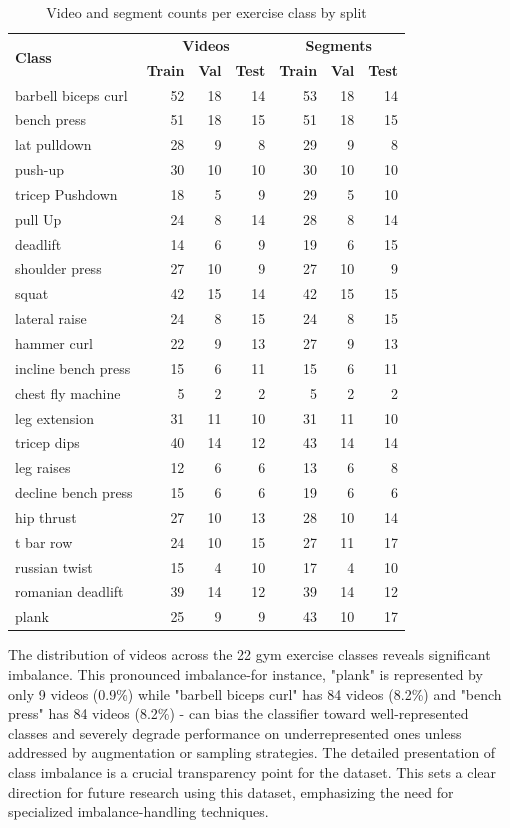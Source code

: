 \documentclass[journal,onecolumn, 11pt]{IEEEtran}
\begin{document}
\begin{table}[H]
\centering
\caption{Video and segment counts per exercise class by split}
\label{tab:counts-per-class}
\begin{tabular}{l r r r | r r r}
\hline
\multirow{2}{*}{\textbf{Class}}   & \multicolumn{3}{c|}{\textbf{Videos}} & \multicolumn{3}{c}{\textbf{Segments}} \\
  & \textbf{Train} & \textbf{Val} & \textbf{Test} & \textbf{Train} & \textbf{Val} & \textbf{Test} \\
\hline
barbell biceps curl & 52 & 18 & 14 & 53 & 18 & 14 \\ 
bench press & 51 & 18 & 15 & 51 & 18 & 15 \\ 
lat pulldown & 28 & 9 & 8 & 29 & 9 & 8 \\ 
push-up & 30 & 10 & 10 & 30 & 10 & 10 \\ 
tricep Pushdown & 18 & 5 & 9 & 29 & 5 & 10 \\ 
pull Up & 24 & 8 & 14 & 28 & 8 & 14 \\ 
deadlift & 14 & 6 & 9 & 19 & 6 & 15 \\ 
shoulder press & 27 & 10 & 9 & 27 & 10 & 9 \\ 
squat & 42 & 15 & 14 & 42 & 15 & 15 \\ 
lateral raise & 24 & 8 & 15 & 24 & 8 & 15 \\ 
hammer curl & 22 & 9 & 13 & 27 & 9 & 13 \\ 
incline bench press & 15 & 6 & 11 & 15 & 6 & 11 \\ 
chest fly machine & 5 & 2 & 2 & 5 & 2 & 2 \\ 
leg extension & 31 & 11 & 10 & 31 & 11 & 10 \\ 
tricep dips & 40 & 14 & 12 & 43 & 14 & 14 \\ 
leg raises & 12 & 6 & 6 & 13 & 6 & 8 \\ 
decline bench press & 15 & 6 & 6 & 19 & 6 & 6 \\ 
hip thrust & 27 & 10 & 13 & 28 & 10 & 14 \\ 
t bar row & 24 & 10 & 15 & 27 & 11 & 17 \\ 
russian twist & 15 & 4 & 10 & 17 & 4 & 10 \\ 
romanian deadlift & 39 & 14 & 12 & 39 & 14 & 12 \\ 
plank & 25 & 9 & 9 & 43 & 10 & 17 \\ 
\hline
\end{tabular}
\end{table}


The distribution of videos across the 22 gym exercise classes reveals significant imbalance. This pronounced imbalance-for instance, "plank" is represented by only 9 videos (0.9\%) while "barbell biceps curl" has 84 videos (8.2\%) and "bench press" has 84 videos (8.2\%) - can bias the classifier toward well-represented classes and severely degrade performance on underrepresented ones unless addressed by augmentation or sampling strategies. The detailed presentation of class imbalance is a crucial transparency point for the dataset. This sets a clear direction for future research using this dataset, emphasizing the need for specialized imbalance-handling techniques.
\end{document}
